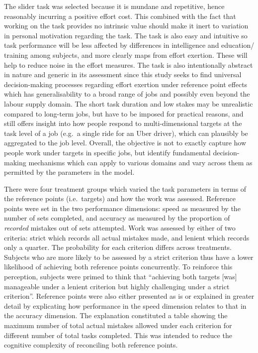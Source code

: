 \documentclass[
  12,
  letterpaper,
  DIV=11,
  numbers=noendperiod]{scrartcl}
\begin{document}
The slider task was selected because it is mundane and repetitive, hence
reasonably incurring a positive effort cost. This combined with the fact
that working on the task provides no intrinsic value should make it
inert to variation in personal motivation regarding the task. The task
is also easy and intuitive so task performance will be less affected by
differences in intelligence and education/ training among subjects, and
more clearly maps from effort exertion. These will help to reduce noise
in the effort measures. The task is also intentionally abstract in
nature and generic in its assessment since this study seeks to find
universal decision-making processes regarding effort exertion under
reference point effects which has generalisability to a broad range of
jobs and possibly even beyond the labour supply domain. The short task
duration and low stakes may be unrealistic compared to long-term jobs,
but have to be imposed for practical reasons, and still offers insight
into how people respond to multi-dimensional targets at the task level
of a job (e.g.~a single ride for an Uber driver), which can plausibly be
aggregated to the job level. Overall, the objective is not to exactly
capture how people work under targets in specific jobs, but identify
fundamental decision-making mechanisms which can apply to various
domains and vary across them as permitted by the parameters in the
model.

There were four treatment groups which varied the task parameters in
terms of the reference points (i.e.~targets) and how the work was
assessed. Reference points were set in the two performance dimensions:
speed as measured by the number of sets completed, and accuracy as
measured by the proportion of \emph{recorded} mistakes out of sets
attempted. Work was assessed by either of two criteria: strict which
records all actual mistakes made, and lenient which records only a
quarter. The probability for each criterion differs across treatments.
Subjects who are more likely to be assessed by a strict criterion thus
have a lower likelihood of achieving both reference points concurrently.
To reinforce this perception, subjects were primed to think that
``achieving both targets {[}was{]} manageable under a lenient criterion
but highly challenging under a strict criterion''. Reference points were
also either presented as is or explained in greater detail by
explicating how performance in the speed dimension relates to that in
the accuracy dimension. The explanation constituted a table showing the
maximum number of total actual mistakes allowed under each criterion for
different number of total tasks completed. This was intended to reduce
the cognitive complexity of reconciling both reference points.
\end{document}
